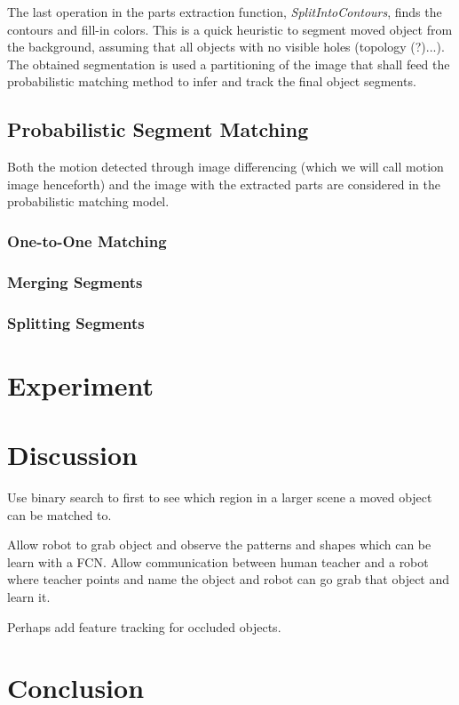 \documentclass{article}
\begin{document}
The last operation in the parts extraction function, \emph{SplitIntoContours}, finds the contours and fill-in colors. This is a quick heuristic to segment moved object from the background, assuming that all objects with no visible holes (topology (?)...). The obtained segmentation is used a partitioning of the image that shall feed the probabilistic matching method to infer and track the final object segments. 

\subsection{Probabilistic Segment Matching}

Both the motion detected through image differencing (which we will call motion image henceforth) and the image with the extracted parts are considered in the probabilistic matching model. 

\subsubsection{One-to-One Matching}

\subsubsection{Merging Segments}

\subsubsection{Splitting Segments}

\section{Experiment}

\section{Discussion}

Use binary search to first to see which region in a larger scene a moved object can be matched to.

Allow robot to grab object and observe the patterns and shapes which can be learn with a FCN. Allow communication between human teacher and a robot where teacher points and name the object and robot can go grab that object and learn it.  

Perhaps add feature tracking for occluded objects. 

\section{Conclusion}
\end{document}
